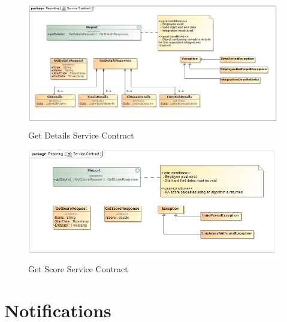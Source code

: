 \documentclass[11pt,a4paper]{article}
\begin{document}
\begin{figure}[H]
	\begin{center}
		\includegraphics[width=\linewidth]{../Images/GetDetails Service Contract.jpg}
		\caption{Get Details Service Contract}
	\end{center}
\end{figure}


\begin{figure}[H]
	\begin{center}
		\includegraphics[width=\linewidth]{../Images/getScore Service Contract.jpg}
		\caption{Get Score Service Contract}
	\end{center}
\end{figure}


\pagebreak

\section{Notifications}
\end{document}

